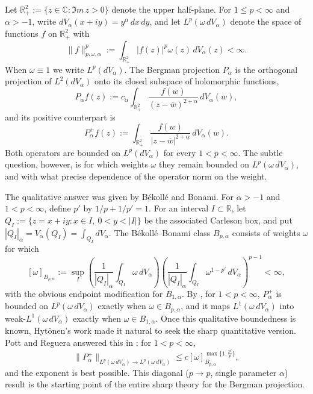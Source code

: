 \documentclass[a4paper,11pt,intlimits,oneside]{amsart}
\theoremstyle{definition}
\numberwithin{equation}{section}
\theoremstyle{definition}
\newcommand{\Be}{\begin{equation}}
\newcommand{\Ee}{\end{equation}}
\begin{document}
Let $\mathbb{R}_+^2:=\{z\in\mathbb{C}: \Im m\, z>0\}$ denote the upper half-plane. For $1\le p<\infty$ and $\alpha>-1$, write $dV_\alpha(x+iy)=y^\alpha\,dx\,dy$, and let $L^p(\omega\, dV_\alpha)$ denote the space of functions $f$ on $\mathbb{R}_+^2$ with
$$\|f\|_{p,\omega,\alpha}^p:=\int_{\mathbb{R}_+^2}|f(z)|^p\omega(z)\,dV_\alpha(z)<\infty.$$
When $\omega\equiv 1$ we write $L^p(dV_\alpha)$. The Bergman projection $P_\alpha$ is the orthogonal projection of $L^2(dV_\alpha)$ onto its closed subspace of holomorphic functions,
$$P_{\alpha}f(z):=c_\alpha\int_{\mathbb{R}_+^2}\frac{f(w)}{(z-\overline{w})^{2+\alpha}}\,dV_\alpha(w),$$
and its positive counterpart is
$$P_{\alpha}^+f(z):=\int_{\mathbb{R}_+^2}\frac{f(w)}{|z-\overline{w}|^{2+\alpha}}\,dV_\alpha(w).$$
Both operators are bounded on $L^p(dV_\alpha)$ for every $1<p<\infty$. The subtle question, however, is for which weights $\omega$ they remain bounded on $L^p(\omega\,dV_\alpha)$, and with what precise dependence of the operator norm on the weight.

The qualitative answer was given by B\'ekoll\'e and Bonami. For $\alpha>-1$ and $1<p<\infty$, define $p'$ by $1/p+1/p'=1$. For an interval $I\subset\mathbb{R}$, let $Q_I:=\{z=x+iy: x\in I,\ 0<y<|I|\}$ be the associated Carleson box, and put $|Q_I|_\alpha=V_\alpha(Q_I)=\int_{Q_I}dV_\alpha$. The B\'ekoll\'e--Bonami class $B_{p,\alpha}$ consists of weights $\omega$ for which
$$[\omega]_{B_{p,\alpha}}:=\sup_{I}\left(\frac{1}{|Q_I|_\alpha}\int_{Q_I}\omega\,dV_\alpha\right)\left(\frac{1}{|Q_I|_\alpha}\int_{Q_I}\omega^{1-p'}\,dV_\alpha\right)^{p-1}<\infty,$$
with the obvious endpoint modification for $B_{1,\alpha}$. By \cite{Bek,BB}, for $1<p<\infty$, $P_\alpha^+$ is bounded on $L^p(\omega\,dV_\alpha)$ exactly when $\omega\in B_{p,\alpha}$, and it maps $L^1(\omega\,dV_\alpha)$ into weak-$L^1(\omega\,dV_\alpha)$ exactly when $\omega\in B_{1,\alpha}$. Once this qualitative boundedness is known, Hyt\"onen's work \cite{Hytonen} made it natural to seek the sharp quantitative version. Pott and Reguera answered this in \cite{PR}: for $1<p<\infty$,
\Be\label{eq:PottReg}
\|P_\alpha^+\|_{L^p(\omega\, dV_\alpha)\rightarrow L^p(\omega\, dV_\alpha)}
\le c[\omega]_{B_{p,\alpha}}^{\max\{1,\frac{p'}{p}\}},
\Ee
and the exponent is best possible. This diagonal ($p\to p$, single parameter $\alpha$) result is the starting point of the entire sharp theory for the Bergman projection.
\end{document}
